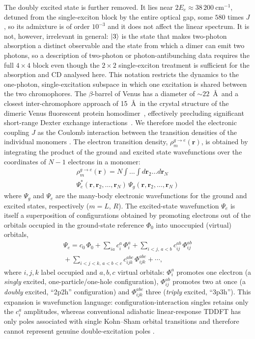 \documentclass[journal=jpcbfk, manuscript=article, layout=twocolumn, doi=true]{achemso}
\begin{document}
The doubly excited state is further removed. It lies near $2E_e \approx 38\,200~\mathrm{cm^{-1}}$, detuned from the single-exciton block by the entire optical gap, some $580$ times $J$, so its admixture is of order $10^{-3}$ and it does not affect the linear spectrum. It is not, however, irrelevant in general: $\ket{3}$ is the state that makes two-photon absorption a distinct observable and the state from which a dimer can emit two photons, so a description of two-photon or photon-antibunching data requires the full $4\times4$ block even though the $2\times2$ single-exciton treatment is sufficient for the absorption and CD analysed here. This notation restricts the dynamics to the one-photon, single-excitation subspace in which one excitation is shared between the two chromophores. The $\beta$-barrel of Venus has a diameter of $\sim 22$~\AA\ and a closest inter-chromophore approach of 15~\AA\ in the crystal structure of the dimeric Venus fluorescent protein homodimer~\cite{kim2019venusa206}, effectively precluding significant short-range Dexter exchange interactions~\cite{skourtis2016dexter}. We therefore model the electronic coupling $J$ as the Coulomb interaction between the transition densities of the individual monomers \cite{hsu2009}. The electron transition density, $\rho^{g\to e}_m(\mathbf r)$, is obtained by integrating the product of the ground and excited state wavefunctions over the coordinates of $N-1$ electrons in a monomer:
\begin{multline} \label{eq:transition_density}
    \rho^{g\to e}_m(\mathbf{r}) =
    N \int \dots \int d\mathbf{r}_2 \dots d\mathbf{r}_N \\ \Psi_e^*(\mathbf{r}, \mathbf{r}_2, \dots, \mathbf{r}_N) \, \Psi_g(\mathbf{r}, \mathbf{r}_2, \dots, \mathbf{r}_N)
\end{multline}
where $\Psi_g$ and $\Psi_e$ are the many-body electronic wavefunctions for the ground and excited states, respectively ($m=L,\,R$).
The excited-state wavefunction $\Psi_e$ is itself a superposition of configurations obtained by promoting electrons out of the orbitals occupied in the ground-state reference $\Phi_0$ into unoccupied (virtual) orbitals,
\begin{multline} \label{eq:ci_expansion}
    \Psi_e = c_0\,\Phi_0 + \sum_{ia} c_i^{a}\,\Phi_i^{a}
    + \sum_{i<j,\,a<b} c_{ij}^{ab}\,\Phi_{ij}^{ab} \\
    {}+ \sum_{i<j<k,\,a<b<c} c_{ijk}^{abc}\,\Phi_{ijk}^{abc} + \cdots,
\end{multline}
where $i,j,k$ label occupied and $a,b,c$ virtual orbitals: $\Phi_i^{a}$ promotes one electron (a \emph{singly} excited, one-particle/one-hole configuration), $\Phi_{ij}^{ab}$ promotes two at once (a \emph{doubly} excited, ``2p2h'' configuration) and $\Phi_{ijk}^{abc}$ three (\emph{triply} excited, ``3p3h''). This expansion is wavefunction language: configuration-interaction singles retains only the $c_i^{a}$ amplitudes, whereas conventional adiabatic linear-response TDDFT has only poles associated with single Kohn--Sham orbital transitions and therefore cannot represent genuine double-excitation poles \cite{maitra2004double}.
\end{document}
